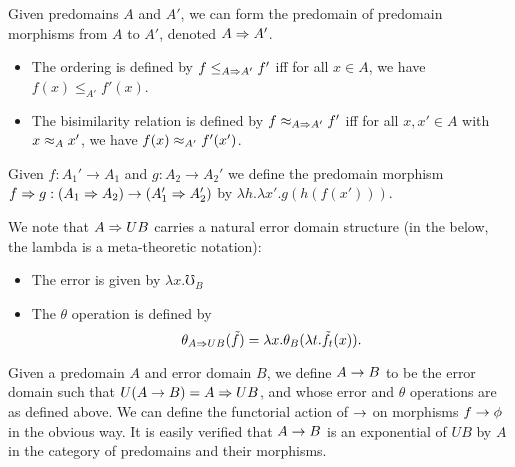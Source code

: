 

Given predomains $A$ and $A'$, we can form the predomain of
predomain morphisms from $A$ to $A'$, denoted $A \Rightarrow A'$.
\begin{itemize}
    \item The ordering is defined by $f \le_{A \Rightarrow A'} f'$ iff for all
    $x \in A$, we have $f(x) \le_{A'} f'(x)$.
    \item The bisimilarity relation is defined by $f \approx_{A \Rightarrow A'} f'$ iff
    for all $x, x' \in A$ with $x \approx_{A} x'$, we have $f(x) \approx_{A'} f'(x')$. 
\end{itemize}
%
Given $f : A_1' \to A_1$ and $g : A_2 \to A_2'$ we define the predomain morphism
$f \Rightarrow g : (A_1 \Rightarrow A_2) \to (A_1' \Rightarrow A_2')$ by $\lambda h. \lambda x'. g(h(f(x')))$.



We note that $A \Rightarrow UB$ carries a natural error domain structure
(in the below, the lambda is a meta-theoretic notation):
\begin{itemize}
    \item The error is given by $\lambda x . \mho_B$
    \item The $\theta$ operation is defined by
      \[ \theta_{A \Rightarrow UB}(\tilde{f}) = \lambda x . \theta_B(\lambda t . \tilde{f}_t(x)). \]
\end{itemize}

Given a predomain $A$ and error domain $B$, we define
$A \to B$ to be the error domain such that $U(A \to B) = A \Rightarrow UB$,
and whose error and $\theta$ operations are as defined above.
We can define the functorial action of $\to$ on morphisms
$f \to \phi$ in the obvious way.
%
It is easily verified that $A \to B$ is an exponential of $UB$ by $A$
in the category of predomains and their morphisms.

